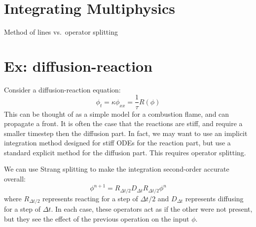 
\begin{quote}
\end{quote}

\section{Integrating Multiphysics}

Method of lines vs.\ operator splitting

\section{Ex: diffusion-reaction}

Consider a diffusion-reaction equation:
\begin{equation}
\phi_t = \kappa \phi_{xx} = \frac{1}{\tau} R(\phi)
\end{equation}
This can be thought of as a simple model for a combustion flame, and
can propagate a front.  It is often the case that the reactions are
stiff, and require a smaller timestep then the diffusion part.  In
fact, we may want to use an implicit integration method designed for
stiff ODEs for the reaction part, but use a standard explicit method
for the diffusion part.  This requires operator splitting.

We can use Strang splitting \cite{strang} to make the integration
second-order accurate overall:
\begin{equation}
\phi^{n+1} = R_{\Delta t/2} D_{\Delta t} R_{\Delta t/2} \phi^n
\end{equation}
where $R_{\Delta t/2}$ represents reacting for a step of $\Delta t/2$
and $D_{\Delta t}$ represents diffusing for a step of $\Delta t$.  In
each case, these operators act as if the other were not present, but
they see the effect of the previous operation on the input $\phi$.  


